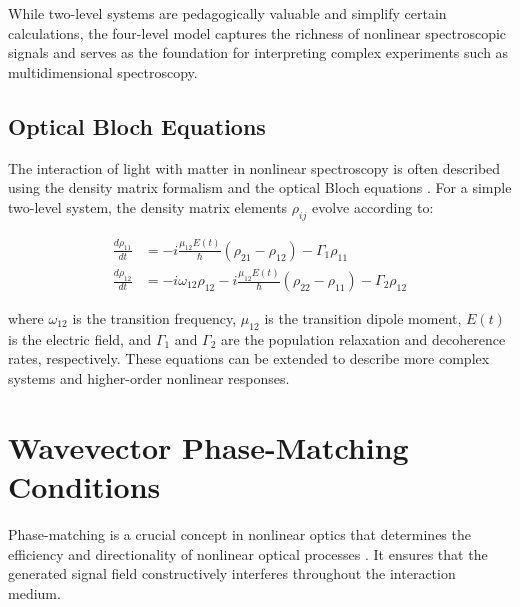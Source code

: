 \noindent While two-level systems are pedagogically valuable and simplify certain calculations, the four-level model captures the richness of nonlinear spectroscopic signals and serves as the foundation for interpreting complex experiments such as multidimensional spectroscopy.

\subsection{Optical Bloch Equations}
\label{subsec:optical_bloch}

\noindent The interaction of light with matter in nonlinear spectroscopy is often described using the density matrix formalism and the optical Bloch equations \cite{Tanimura1989}. For a simple two-level system, the density matrix elements $\rho_{ij}$ evolve according to:

\begin{align}
    \frac{d\rho_{11}}{dt} & = -i\frac{\mu_{12}E(t)}{\hbar}(\rho_{21} - \rho_{12}) - \Gamma_1 \rho_{11} \label{eq:bloch_population}                        \\
    \frac{d\rho_{12}}{dt} & = -i\omega_{12}\rho_{12} - i\frac{\mu_{12}E(t)}{\hbar}(\rho_{22} - \rho_{11}) - \Gamma_2 \rho_{12} \label{eq:bloch_coherence}
\end{align}

\noindent where $\omega_{12}$ is the transition frequency, $\mu_{12}$ is the transition dipole moment, $E(t)$ is the electric field, and $\Gamma_1$ and $\Gamma_2$ are the population relaxation and decoherence rates, respectively. These equations can be extended to describe more complex systems and higher-order nonlinear responses.


\section{Wavevector Phase-Matching Conditions}
\label{sec:phase_matching}

\noindent Phase-matching is a crucial concept in nonlinear optics that determines the efficiency and directionality of nonlinear optical processes \cite{Boyd2008, Scheurer2001}. It ensures that the generated signal field constructively interferes throughout the interaction medium.

